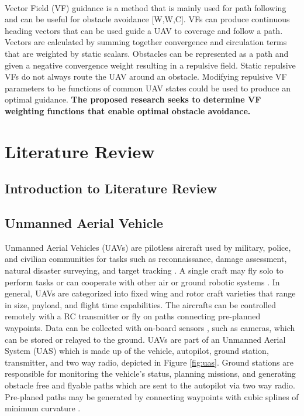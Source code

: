 \documentclass[numbered,pdftex]{ohio-etd}
\begin{document}
\\
Vector Field (VF) guidance is a method that is mainly used for path following and can be useful for obstacle avoidance [W,W,C]. VFs can produce continuous heading vectors that can be used guide a UAV to coverage and follow a path. Vectors are calculated by summing together convergence and circulation terms that are weighted by static scalars. Obstacles can be represented as a path and given a negative convergence weight resulting in a repulsive field. Static repulsive VFs do not always route the UAV around an obstacle. Modifying repulsive VF parameters to be functions of common UAV states could be used to produce an optimal guidance. \textbf{The proposed research seeks to determine VF weighting functions that enable optimal obstacle avoidance.}



 \pagebreak
 
 





\chapter{Literature Review}
\section{Introduction to Literature Review}


\section{Unmanned Aerial Vehicle}

Unmanned Aerial Vehicles (UAVs) are pilotless aircraft used by military, police, and civilian communities for tasks such as reconnaissance, damage assessment, natural disaster surveying, and target tracking \cite{ariyur_autonomous_2008,teuliere_chasing_2011}. A single craft may fly solo to perform tasks or can cooperate with other air or ground robotic systems \cite{oh_coordinated_2013,hyondong_oh_coordinated_2015,ulun_coordinated_2013}. In general, UAVs are categorized into fixed wing and rotor craft varieties \cite{beard_small_2012} that range in size, payload, and flight time capabilities. The aircrafts can be controlled remotely with a RC transmitter or fly on paths connecting pre-planned waypoints. Data can be collected with on-board sensors \cite{choi_open_2016,martinez_-board_2011}, such as cameras, which can be stored or relayed to the ground. UAVs are part of an Unmanned Aerial System (UAS) which is made up of the vehicle, autopilot, ground station, transmitter, and two way radio, depicted in Figure \ref{fig:uas}. Ground stations are responsible for monitoring the vehicle's status, planning missions, and generating obstacle free and flyable paths which are sent to the autopilot via two way radio. Pre-planed paths may be generated by connecting waypoints with cubic splines of minimum curvature \cite{yamasaki_integrated_2012}.
\end{document}
